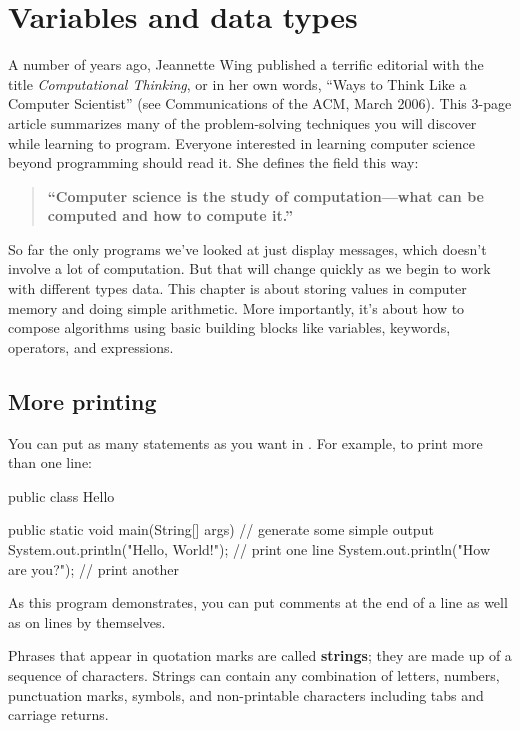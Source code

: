 \chapter{Variables and data types}

A number of years ago, Jeannette Wing published a terrific editorial with the title {\it Computational Thinking}, or in her own words, ``Ways to Think Like a Computer Scientist'' (see Communications of the ACM, March 2006).
This 3-page article summarizes many of the problem-solving techniques you will discover while learning to program.
Everyone interested in learning computer science beyond programming should read it.
She defines the field this way:

\begin{quote}
{\bf ``Computer science is the study of computation---what can be computed and how to compute it.''}
\end{quote}

So far the only programs we've looked at just display messages, which doesn't involve a lot of computation.
But that will change quickly as we begin to work with different types data.
This chapter is about storing values in computer memory and doing simple arithmetic.
More importantly, it's about how to compose algorithms using basic building blocks like variables, keywords, operators, and expressions.

\section{More printing}

You can put as many statements as you want in .
For example, to print more than one line:

\begin{code}
public class Hello {

    public static void main(String[] args) {
        // generate some simple output
        System.out.println("Hello, World!");  // print one line
        System.out.println("How are you?");   // print another
    }

}
\end{code}

As this program demonstrates, you can put comments at the end of a line as well as on lines by themselves.


Phrases that appear in quotation marks are called {\bf strings}; they are made up of a sequence of characters.
Strings can contain any combination of letters, numbers, punctuation marks, symbols, and non-printable characters including tabs and carriage returns.

